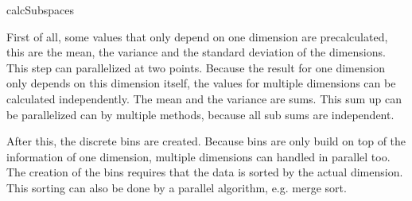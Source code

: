 \begin{algorithm}


	\caption{calcSubspaces}
	\label{alg:calcSubspaces}
\end{algorithm}

First of all, some values that only depend on one dimension are precalculated, this are the mean, the variance and the standard deviation of the dimensions. This step can parallelized at two points. Because the result for one dimension only depends on this dimension itself, the values for multiple dimensions can be calculated independently. The mean and the variance are sums. This sum up can be parallelized can by multiple methods, because all sub sums are independent.

After this, the discrete bins are created. Because bins are only build on top of the information of one dimension, multiple dimensions can handled in parallel too. The creation of the bins requires that the data is sorted by the actual dimension. This sorting can also be done by a parallel algorithm, e.g. merge sort.

